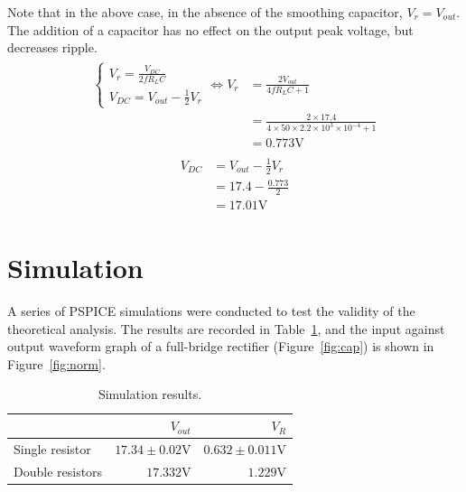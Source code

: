 \documentclass[12pt]{article}
\begin{document}
Note that in the above case, in the absence of the smoothing capacitor, $V_r=V_{out}$. The addition of a capacitor has no effect on the output peak voltage, but decreases ripple.
\begin{align}
\begin{split}
  \begin{cases}
  V_{r}=\frac{V_{DC}}{2f R_L C}\\
  V_{DC}=V_{out}-\frac{1}{2}V_r
  \end{cases}
  \Leftrightarrow
  V_{r}&=\frac{2V_{out}}{4fR_LC+1}\\
  &=\frac{2\times17.4}{4\times50\times2.2\times10^{3}\times10^{-4}+1}\\
  &=0.773\mathrm{V}
\label{eq:cap}
\end{split}
\end{align}
\begin{align}
  \begin{split}
    V_{DC}&=V_{out}-\frac{1}{2}V_r\\
    &=17.4-\frac{0.773}{2}\\
    &=17.01\mathrm{V}
  \end{split}
  \label{eq:capdc}
\end{align}

\section{Simulation}
\label{sec:sim}
A series of PSPICE simulations were conducted to test the validity of the theoretical analysis. The results are recorded in Table~\ref{tab:sim}, and the input against output waveform graph of a full-bridge rectifier (Figure~\ref{fig:cap}) is shown in Figure~\ref{fig:norm}.
\begin{table}[h!]
\centering
\caption{Simulation results.}  
\begin{tabular}{|l|r|r|}
\hline
&$V_{out}$&$V_R$\\ \hline
Single resistor&$17.34\pm0.02\mathrm{V}$&$0.632\pm0.011\mathrm{V}$\\ \hline
Double resistors&$17.332\mathrm{V}$&$1.229\mathrm{V}$\\ \hline
\end{tabular}
\label{tab:sim}
\end{table}
\end{document}

